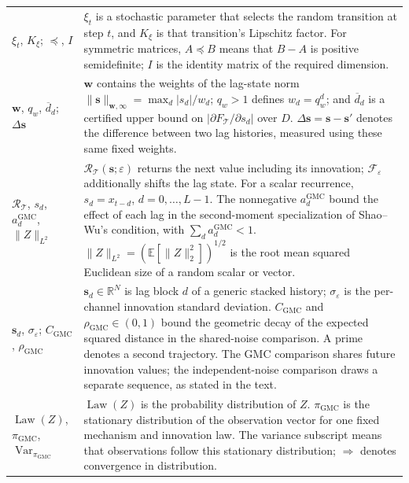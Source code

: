 \begin{longtable}{@{}
>{\raggedright\arraybackslash}p{}
>{\raggedright\arraybackslash}p{}@{}}
$\xi_t$, $K_{\xi}$; $\preceq$, $I$ &
$\xi_t$ is a stochastic parameter that selects the random transition at step
$t$, and $K_{\xi}$ is that transition's Lipschitz factor. For symmetric
matrices, $A\preceq B$ means that $B-A$ is positive semidefinite; $I$ is the
identity matrix of the required dimension. \\

$\mathbf w$, $q_w$, $\overline d_d$; $\Delta\mathbf{s}$ &
$\mathbf w$ contains the weights of the lag-state norm
$\|\mathbf{s}\|_{\mathbf w,\infty}=\max_d|s_d|/w_d$;
$q_w>1$ defines $w_d=q_w^d$; and $\overline d_d$ is a certified upper bound on
$|\partial F_{\mathcal T}/\partial s_d|$ over $D$.
$\Delta\mathbf{s}=\mathbf{s}-\mathbf{s}'$ denotes the difference between
two lag histories, measured using these same fixed weights. \\

$\mathcal R_{\mathcal T}$, $s_d$, $a_d^{\mathrm{GMC}}$,
$\|Z\|_{L^2}$ &
$\mathcal R_{\mathcal T}(\mathbf{s};\varepsilon)$ returns the next value
including its innovation; $\mathcal F_{\varepsilon}$ additionally shifts the
lag state. For a scalar recurrence, $s_d=x_{t-d}$,
$d=0,\ldots,L-1$. The nonnegative $a_d^{\mathrm{GMC}}$ bound the effect of
each lag in the second-moment specialization of Shao--Wu's condition, with
$\sum_d a_d^{\mathrm{GMC}}<1$.
$\|Z\|_{L^2}=(\mathbb E[\|Z\|_2^2])^{1/2}$ is the root mean squared
Euclidean size of a random scalar or vector. \\

$\mathbf{s}_d$, $\sigma_\varepsilon$;
$C_{\mathrm{GMC}}$, $\rho_{\mathrm{GMC}}$ &
$\mathbf{s}_d\in\mathbb R^N$ is lag block $d$ of a generic stacked history;
$\sigma_\varepsilon$ is the per-channel innovation standard deviation.
$C_{\mathrm{GMC}}$ and $\rho_{\mathrm{GMC}}\in(0,1)$ bound the geometric
decay of the expected squared distance in the shared-noise comparison. A prime
denotes a second trajectory. The GMC comparison shares future innovation
values; the independent-noise comparison draws a separate sequence, as stated
in the text. \\

$\operatorname{Law}(Z)$, $\pi_{\mathrm{GMC}}$,
$\operatorname{Var}_{\pi_{\mathrm{GMC}}}$ &
$\operatorname{Law}(Z)$ is the probability distribution of $Z$.
$\pi_{\mathrm{GMC}}$ is the stationary distribution of the observation vector
for one fixed mechanism and innovation law. The variance subscript means that
observations follow this stationary distribution; $\Rightarrow$ denotes
convergence in distribution. \\


\end{longtable}
